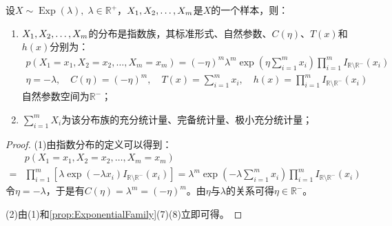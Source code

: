 \begin{theorem}
	设$X\sim\operatorname{Exp}(\lambda),\;\lambda\in\mathbb{R}^{+}$，$X_1, X_2, \dots, X_{m}$是$X$的一个样本，则：
	\begin{enumerate}
		\item $X_1, X_2, \dots, X_{m}$的分布是指数族，其标准形式、自然参数、$C(\eta)$、$T(x)$和$h(x)$分别为：
		\begin{gather*}
			p(X_1=x_1,X_2=x_2,\dots,X_m=x_m) =(-\eta)^m\lambda^m\exp\left(\eta\sum_{i=1}^{m}x_i\right)\prod_{i=1}^mI_{\mathbb{R}\setminus\mathbb{R}^{-}}(x_i) \\
			\eta=-\lambda,\quad C(\eta)=(-\eta)^m,\quad
			T(x)=\sum_{i=1}^{m}x_i,\quad h(x)=\prod_{i=1}^{m}I_{\mathbb{R}\setminus\mathbb{R}^{-}}(x_i)
		\end{gather*}
		自然参数空间为$\mathbb{R}^{-}$；
		\item $\sum\limits_{i=1}^{m}X_i$为该分布族的充分统计量、完备统计量、极小充分统计量；
	\end{enumerate}
\end{theorem}
\begin{proof}
	(1)由指数分布的定义可以得到：
	\begin{align*}
		&p(X_1=x_1,X_2=x_2,\dots,X_m=x_m) \\
		=&\prod_{i=1}^{m}\left[\lambda\exp(-\lambda x_i)I_{\mathbb{R}\setminus\mathbb{R}^{-}}(x_i)\right]=\lambda^m\exp\left(-\lambda\sum_{i=1}^{m}x_i\right)\prod_{i=1}^mI_{\mathbb{R}\setminus\mathbb{R}^{-}}(x_i)
	\end{align*}
	令$\eta=-\lambda$，于是有$C(\eta)=\lambda^m=(-\eta)^m$。由$\eta$与$\lambda$的关系可得$\eta\in\mathbb{R}^{-}$。\par
	(2)由(1)和\cref{prop:ExponentialFamily}(7)(8)立即可得。
\end{proof}

